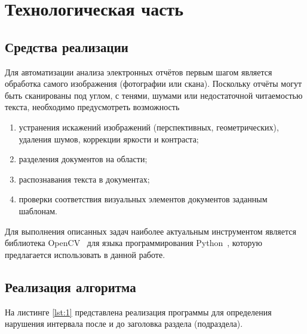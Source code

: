 \chapter{Технологическая часть}

\section{Средства реализации}

Для автоматизации анализа электронных отчётов первым шагом является обработка самого изображения (фотографии или скана). Поскольку отчёты могут быть сканированы под углом, с тенями, шумами или недостаточной читаемостью текста, необходимо предусмотреть возможность
\begin{enumerate}[label*=---]
	\item устранения искажений изображений (перспективных, геометрических), удаления шумов, коррекции яркости и контраста;
	\item разделения документов на области;
	\item распознавания текста в документах;
	\item проверки соответствия визуальных элементов документов заданным шаблонам.
\end{enumerate}

Для выполнения описанных задач наиболее актуальным инструментом является библиотека OpenCV~\cite{opencv} для языка программирования Python~\cite{pythonlang}, которую предлагается использовать в данной работе.

\section{Реализация алгоритма}

На листинге \ref{lst:1} представлена реализация программы для определения нарушения интервала после и до заголовка раздела (подраздела).

